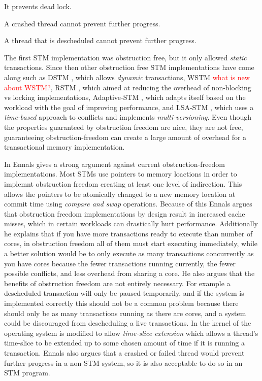 It prevents dead lock.

A crashed thread cannot prevent further progress.

A thread that is descheduled cannot prevent further progress.

The first STM implementation \cite{224987} was obstruction free, but it only allowed \emph{static} transactions.
Since then other obstruction free STM implementations have come along such as DSTM \cite{872048}, which allows \emph{dynamic} transactions, WSTM \cite{Fraser:2007:CPW:1233307.1233309} \textcolor{Red}{what is new about WSTM?}, RSTM \cite{Marathe06loweringthe}, which aimed at reducing the overhead of non-blocking vs locking implementations, Adaptive-STM \cite{Marathe05adaptivesoftware}, which adapts itself based on the workload with the goal of improving performance, and LSA-STM \cite{10.1109/TPDS.2010.49}, which uses a \emph{time-based} approach to conflicts and implements \emph{multi-versioning}.
Even though the properties guaranteed by obstruction freedom are nice, they are not free, guaranteeing obstruction-freedom can create a large amount of overhead for a transactional memory implementation.

In \cite{Ennals06softwaretransactional} Ennals gives a strong argument against current obstruction-freedom implementations.
Most STMs use pointers to memory loactions in order to implemnt obstruction freedom creating at least one level of indirection.
This allows the pointers to be atomically changed to a new memory location at commit time using \emph{compare and swap} operations.
Because of this Ennals argues that obstruction freedom implementations by design result in increased cache misses, which in certain workloads can drastically hurt performance.
Additionally he explains that if you have more transactions ready to execute than number of cores, in obstruction freedom all of them must start executing immediately, while a better solution would be to only execute as many transactions concurrently as you have cores because the fewer transactions running currently, the fewer possible conflicts, and less overhead from sharing a core.
He also argues that the benefits of obstruction freedom are not entirely necessary.
For example a descheduled transaction will only be paused temporarily, and if the system is implemented correctly this should not be a common problem because there should only be as many transactions running as there are cores, and a system could be discouraged from descheduling a live transactions.
In \cite{1693465} the kernel of the operating system is modified to allow \emph{time-slice extension} which allows a thread's time-slice to be extended up to some chosen amount of time if it is running a transaction.
Ennals also argues that a crashed or failed thread would prevent further progress in a non-STM system, so it is also acceptable to do so in an STM program.

